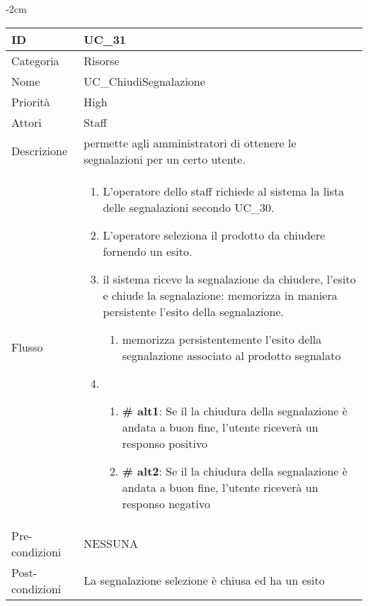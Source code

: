 \begin{center}
\begin{table}[bp]
    \centering
    \addtolength{\leftskip} {-2cm}
\begin{tabular}{ |p{2.6cm}|p{13cm}|  }
\hline
ID & UC\_31 \\\hline
Categoria & Risorse\\\hline
Nome & UC\_ChiudiSegnalazione\\\hline
Priorità & High \\\hline
Attori &  Staff \\\hline
Descrizione & permette agli amministratori di ottenere le segnalazioni per un certo utente.\\\hline
Flusso &  	\begin{enumerate}
			\item L'operatore dello staff richiede al sistema la lista delle segnalazioni secondo UC\_30.
			\item L'operatore seleziona il prodotto da chiudere fornendo un esito.
			\item il sistema riceve la segnalazione da chiudere, l'esito e chiude la segnalazione: 
			memorizza in maniera persistente l'esito della segnalazione. 
			\begin{enumerate}
			\item memorizza persistentemente l'esito della segnalazione associato al prodotto segnalato
			\end{enumerate}
			\item \begin{enumerate}[label= ]
				\item \textbf{\# alt1}: Se il la chiudura della segnalazione è andata a buon fine, l'utente riceverà un responso positivo
				\item \textbf{\# alt2}: Se il la chiudura della segnalazione è andata a buon fine, l'utente riceverà un responso negativo
			\end{enumerate}
			\end{enumerate}
			\\\hline
Pre-condizioni & NESSUNA\\\hline
Post-condizioni & La segnalazione selezione è chiusa ed ha un esito\\\hline
\end{tabular}
\label{table_use_case:31}\newline
\end{table}


\end{center}
